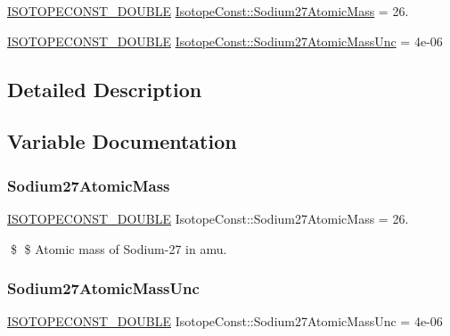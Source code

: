 \begin{DoxyCompactItemize}
\item 
\mbox{\hyperlink{group___isotope_const-_macros_ga8f45a7272ce02c0b4c65c44636ed719a}{I\+S\+O\+T\+O\+P\+E\+C\+O\+N\+S\+T\+\_\+\+D\+O\+U\+B\+LE}} \mbox{\hyperlink{group___isotope_const-_sodium-_na27_ga09077fd3a37524b2214adae0462001c3}{Isotope\+Const\+::\+Sodium27\+Atomic\+Mass}} = 26.
\item 
\mbox{\hyperlink{group___isotope_const-_macros_ga8f45a7272ce02c0b4c65c44636ed719a}{I\+S\+O\+T\+O\+P\+E\+C\+O\+N\+S\+T\+\_\+\+D\+O\+U\+B\+LE}} \mbox{\hyperlink{group___isotope_const-_sodium-_na27_ga1f3f868e22c4bb7dac82e4fc4f8103cf}{Isotope\+Const\+::\+Sodium27\+Atomic\+Mass\+Unc}} = 4e-\/06
\end{DoxyCompactItemize}


\subsection{Detailed Description}


\subsection{Variable Documentation}
\mbox{\label{group___isotope_const-_sodium-_na27_ga09077fd3a37524b2214adae0462001c3}} 
\subsubsection{\texorpdfstring{Sodium27\+Atomic\+Mass}{Sodium27AtomicMass}}
{\footnotesize\ttfamily \mbox{\hyperlink{group___isotope_const-_macros_ga8f45a7272ce02c0b4c65c44636ed719a}{I\+S\+O\+T\+O\+P\+E\+C\+O\+N\+S\+T\+\_\+\+D\+O\+U\+B\+LE}} Isotope\+Const\+::\+Sodium27\+Atomic\+Mass = 26.}

\$ \$ Atomic mass of Sodium-\/27 in amu. \mbox{\label{group___isotope_const-_sodium-_na27_ga1f3f868e22c4bb7dac82e4fc4f8103cf}} 
\subsubsection{\texorpdfstring{Sodium27\+Atomic\+Mass\+Unc}{Sodium27AtomicMassUnc}}
{\footnotesize\ttfamily \mbox{\hyperlink{group___isotope_const-_macros_ga8f45a7272ce02c0b4c65c44636ed719a}{I\+S\+O\+T\+O\+P\+E\+C\+O\+N\+S\+T\+\_\+\+D\+O\+U\+B\+LE}} Isotope\+Const\+::\+Sodium27\+Atomic\+Mass\+Unc = 4e-\/06}

